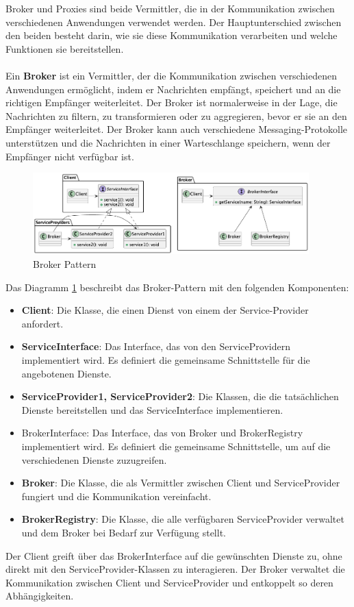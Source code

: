 Broker und Proxies sind beide Vermittler, die in der Kommunikation zwischen verschiedenen Anwendungen verwendet werden. Der Hauptunterschied zwischen den beiden besteht darin, wie sie diese Kommunikation verarbeiten und welche Funktionen sie bereitstellen.
\\\\
Ein \textbf{Broker} ist ein Vermittler, der die Kommunikation zwischen verschiedenen Anwendungen ermöglicht, indem er Nachrichten empfängt, speichert und an die richtigen Empfänger weiterleitet. Der Broker ist normalerweise in der Lage, die Nachrichten zu filtern, zu transformieren oder zu aggregieren, bevor er sie an den Empfänger weiterleitet. Der Broker kann auch verschiedene Messaging-Protokolle unterstützen und die Nachrichten in einer Warteschlange speichern, wenn der Empfänger nicht verfügbar ist. 

\begin{figure}[ht]
  \centering
  \includegraphics[width=0.95\textwidth]{fig/uml/broker.png}
  \caption{Broker Pattern}
  \label{fig:broker}
\end{figure}

Das Diagramm \ref{fig:broker} beschreibt das Broker-Pattern mit den folgenden Komponenten:
\begin{itemize}
\item \textbf{Client}: Die Klasse, die einen Dienst von einem der Service-Provider anfordert.
\item \textbf{ServiceInterface}: Das Interface, das von den ServiceProvidern implementiert wird. Es definiert die gemeinsame Schnittstelle für die angebotenen Dienste.
\item \textbf{ServiceProvider1, ServiceProvider2}: Die Klassen, die die tatsächlichen Dienste bereitstellen und das ServiceInterface implementieren.
\item BrokerInterface: Das Interface, das von Broker und BrokerRegistry implementiert wird. Es definiert die gemeinsame Schnittstelle, um auf die verschiedenen Dienste zuzugreifen.
\item \textbf{Broker}: Die Klasse, die als Vermittler zwischen Client und ServiceProvider fungiert und die Kommunikation vereinfacht.
\item \textbf{BrokerRegistry}: Die Klasse, die alle verfügbaren ServiceProvider verwaltet und dem Broker bei Bedarf zur Verfügung stellt.
\end{itemize}
Der Client greift über das BrokerInterface auf die gewünschten Dienste zu, ohne direkt mit den ServiceProvider-Klassen zu interagieren. Der Broker verwaltet die Kommunikation zwischen Client und ServiceProvider und entkoppelt so deren Abhängigkeiten.

